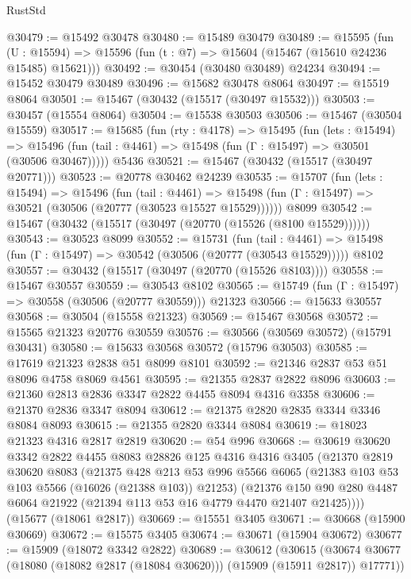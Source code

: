 \begin{lexlean}{RustStd}
\begin{coremodule}
@30479 := @15492 @30478
@30480 := @15489 @30479
@30489 := @15595
    (fun (U : @15594) => @15596 (fun (t : @7) => @15604 (@15467 (@15610 @24236 @15485) @15621)))
@30492 := @30454 (@30480 @30489) @24234
@30494 := @15452 @30479 @30489
@30496 := @15682 @30478 @8064
@30497 := @15519 @8064
@30501 := @15467 (@30432 (@15517 (@30497 @15532)))
@30503 := @30457 (@15554 @8064)
@30504 := @15538 @30503
@30506 := @15467 (@30504 @15559)
@30517 := @15685
    (fun (rty : @4178) =>
    @15495
      (fun (lets : @15494) =>
      @15496 (fun (tail : @4461) => @15498 (fun (Γ : @15497) => @30501 (@30506 @30467)))))
    @5436
@30521 := @15467 (@30432 (@15517 (@30497 @20771)))
@30523 := @20778 @30462 @24239
@30535 := @15707
    (fun (lets : @15494) =>
    @15496
      (fun (tail : @4461) =>
      @15498 (fun (Γ : @15497) => @30521 (@30506 (@20777 (@30523 @15527 @15529))))))
    @8099
@30542 := @15467 (@30432 (@15517 (@30497 (@20770 (@15526 (@8100 @15529))))))
@30543 := @30523 @8099
@30552 := @15731
    (fun (tail : @4461) => @15498 (fun (Γ : @15497) => @30542 (@30506 (@20777 (@30543 @15529)))))
    @8102
@30557 := @30432 (@15517 (@30497 (@20770 (@15526 @8103))))
@30558 := @15467 @30557
@30559 := @30543 @8102
@30565 := @15749 (fun (Γ : @15497) => @30558 (@30506 (@20777 @30559))) @21323
@30566 := @15633 @30557
@30568 := @30504 (@15558 @21323)
@30569 := @15467 @30568
@30572 := @15565 @21323 @20776 @30559
@30576 := @30566 (@30569 @30572) (@15791 @30431)
@30580 := @15633 @30568 @30572 (@15796 @30503)
@30585 := @17619 @21323 @2838 @51 @8099 @8101
@30592 := @21346 @2837 @53 @51 @8096 @4758 @8069 @4561
@30595 := @21355 @2837 @2822 @8096
@30603 := @21360 @2813 @2836 @3347 @2822 @4455 @8094 @4316 @3358
@30606 := @21370 @2836 @3347 @8094
@30612 := @21375 @2820 @2835 @3344 @3346 @8084 @8093
@30615 := @21355 @2820 @3344 @8084
@30619 := @18023 @21323 @4316 @2817 @2819
@30620 := @54 @996
@30668 := @30619
    @30620
    @3342
    @2822
    @4455
    @8083
    @28826
    @125
    @4316
    @4316
    @3405
    (@21370
      @2819
      @30620
      @8083
      (@21375
        @428
        @213
        @53
        @996
        @5566
        @6065
        (@21383 @103 @53 @103 @5566 (@16026 (@21388 @103)) @21253)
        (@21376 @150 @90 @280 @4487 @6064 @21922 (@21394 @113 @53 @16 @4779 @4470 @21407 @21425))))
    (@15677 (@18061 @2817))
@30669 := @15551 @3405
@30671 := @30668 (@15900 @30669)
@30672 := @15575 @3405
@30674 := @30671 (@15904 @30672)
@30677 := @15909 (@18072 @3342 @2822)
@30689 := @30612
    (@30615 (@30674 @30677 (@18080 (@18082 @2817 (@18084 @30620))) (@15909 (@15911 @2817)) @17771))

\end{coremodule}
\end{lexlean}
